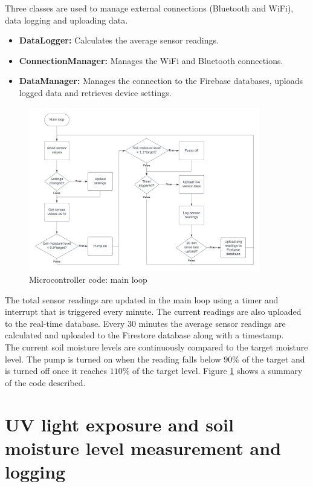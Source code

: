 Three classes are used to manage external connections (Bluetooth and WiFi), data logging and uploading data. 
\begin{itemize}
    \item \textbf{DataLogger:} Calculates the average sensor readings.
    \item \textbf{ConnectionManager:} Manages the WiFi and Bluetooth connections.
    \item \textbf{DataManager:} Manages the connection to the Firebase databases, uploads logged data and retrieves device settings.
\end{itemize}

\begin{figure}[!h]
    \centering
    \includegraphics[width= 0.9\textwidth]{Report/detail_design/fig/main_loop_flow.png}
    \caption{Microcontroller code: main loop}
    \label{fig:main_loop_flow}
\end{figure}

The total sensor readings are updated in the main loop using a timer and interrupt that is triggered every minute. The current readings are also uploaded to the real-time database. Every 30 minutes the average sensor readings are calculated and uploaded to the Firestore database along with a timestamp.
\\
The current soil moisture levels are continuously compared to the target moisture level. The pump is turned on when the reading falls below $90\%$ of the target and is turned off once it reaches $110\%$ of the target level. Figure \ref{fig:main_loop_flow} shows a summary of the code described.

\section{UV light exposure and soil moisture level measurement and logging}

